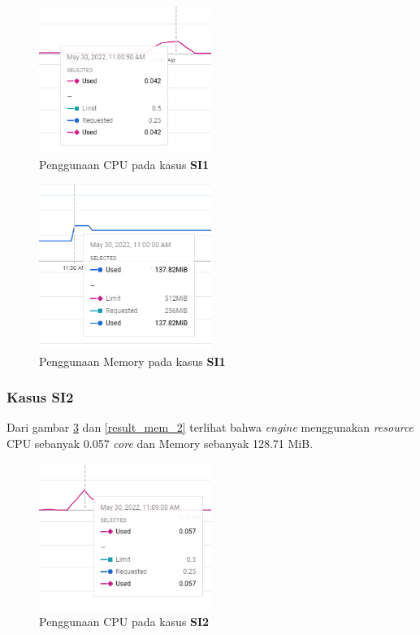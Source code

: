 \begin{figure}[!htb]
	\centering
	\includegraphics[width=0.5\textwidth]{resources/ch4/resource/1-cpu.png}
	\caption{Penggunaan CPU pada kasus \textbf{SI1}}
	\label{result_cpu_1}
\end{figure}

\begin{figure}[!htb]
	\centering
	\includegraphics[width=0.5\textwidth]{resources/ch4/resource/1-mem.png}
	\caption{Penggunaan Memory pada kasus \textbf{SI1}}
	\label{result_mem_1}
\end{figure}

\pagebreak

\subsubsection{Kasus SI2}
Dari gambar \ref{result_cpu_2} dan \ref{result_mem_2} terlihat bahwa \textit{engine} menggunakan \textit{resource} CPU sebanyak 0.057 \textit{core} dan Memory sebanyak 128.71 MiB. 

\begin{figure}[!htb]
	\centering
	\includegraphics[width=0.5\textwidth]{resources/ch4/resource/2-cpu.png}
	\caption{Penggunaan CPU pada kasus \textbf{SI2}}
	\label{result_cpu_2}
\end{figure}

